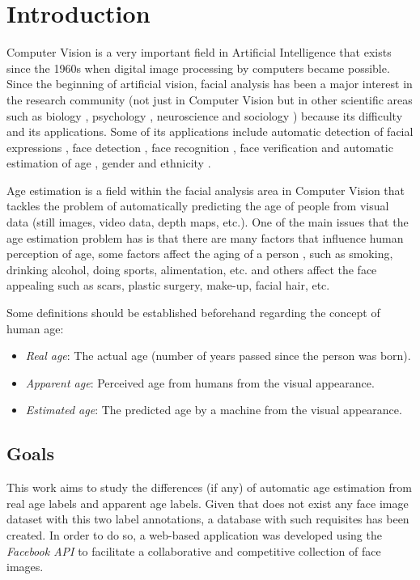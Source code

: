\chapter{Introduction} \label{chap:introduction}

Computer Vision is a very important field in Artificial Intelligence that exists since the 1960s when digital image processing by computers became possible. Since the beginning of artificial vision, facial analysis has been a major interest in the research community (not just in Computer Vision but in other scientific areas such as biology \cite{bhl24064}, psychology \cite{ekm02}, neuroscience \cite{freiwald2009face} and sociology \cite{kemper1978social}) because its difficulty and its applications. Some of its applications include automatic detection of facial expressions \cite{cohen2003facial}, face detection \cite{hsu2002face}, face recognition \cite{wright2009robust}, face verification \cite{taigman2014deepface} and automatic estimation of age \cite{4359348}, gender \cite{alexandre2010gender} and ethnicity \cite{hosoi2004ethnicity}.

Age estimation is a field within the facial analysis area in Computer Vision that tackles the problem of automatically predicting the age of people from visual data (still images, video data, depth maps, etc.). One of the main issues that the age estimation problem has is that there are many factors that influence human perception of age, some factors affect the aging of a person \cite{shephard1997aging}, such as smoking, drinking alcohol, doing sports, alimentation, etc. and others affect the face appealing such as scars, plastic surgery, make-up, facial hair, etc.

Some definitions should be established beforehand regarding the concept of human age:
\begin{itemize}
	\item \textit{Real age}: The actual age (number of years passed since the person was born).
	\item \textit{Apparent age}: Perceived age from humans from the visual appearance. 
	\item \textit{Estimated age}: The predicted age by a machine from the visual appearance.
\end{itemize}

\section{Goals}
This work aims to study the differences (if any) of automatic age estimation from real age labels and apparent age labels. Given that does not exist any face image dataset with this two label annotations, a database with such requisites has been created. In order to do so, a web-based application was developed using the \textit{Facebook API} to facilitate a collaborative and competitive collection of face images.

